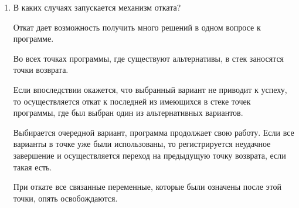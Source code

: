 \documentclass[a4paper,14pt]{extreport} %
\begin{document}
\begin{enumerate}
\item В каких случаях запускается механизм отката?

Откат дает возможность получить много решений в одном вопросе к программе. 

Во всех точках программы, где существуют альтернативы, в стек заносятся точки возврата. 

Если впоследствии окажется, что выбранный вариант не приводит к успеху, то осуществляется откат к последней из имеющихся в стеке точек программы, где был выбран один из альтернативных вариантов. 

Выбирается очередной вариант, программа продолжает свою работу. Если все варианты в точке уже были использованы, то регистрируется неудачное завершение и осуществляется переход на предыдущую точку возврата, если такая есть. 

При откате все связанные переменные, которые были означены после этой точки, опять освобождаются.

\end{enumerate}
 
\end{document}
